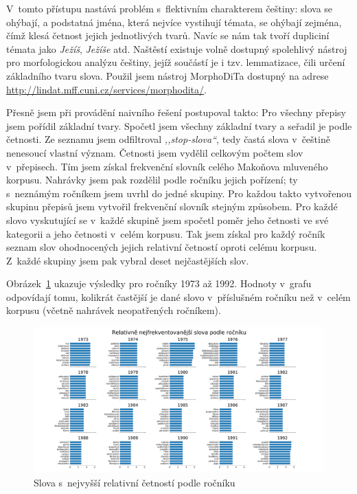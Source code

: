 V~tomto přístupu nastává problém s~flektivním charakterem češtiny: slova se
ohýbají, a podstatná jména, která nejvíce vystihují témata, se ohýbají zejména,
čímž klesá četnost jejich jednotlivých tvarů. Navíc se nám tak tvoří dupliciní
témata jako \textit{Ježíš}, \textit{Ježíše} atd. Naštěstí existuje volně
dostupný spolehlivý nástroj pro morfologickou analýzu češtiny, jejíž součástí je
i tzv. lemmatizace, čili určení základního tvaru slova. Použil jsem nástroj
MorphoDiTa dostupný na adrese
\url{http://lindat.mff.cuni.cz/services/morphodita/}\cite{morphodita}.

Přesně jsem při provádění naivního řešení postupoval takto:
Pro všechny přepisy jsem pořídil základní tvary.
Spočetl jsem všechny základní tvary a seřadil je podle četnosti.
Ze seznamu jsem odfiltroval \textit{,,stop-slova``}, tedy častá slova v~češtině
nenesoucí vlastní význam.
Četnosti jsem vydělil celkovým počtem slov v~přepisech. Tím jsem získal
frekvenční slovník celého Makoňova mluveného korpusu.
Nahrávky jsem pak rozdělil podle ročníku jejich pořízení; ty s~neznámým ročníkem
jsem uvrhl do jedné skupiny.
Pro každou takto vytvořenou skupinu přepisů jsem vytvořil frekvenční slovník
stejným způsobem.
Pro každé slovo vyskutující se v~každé skupině jsem spočetl poměr jeho četnosti
ve své kategorii a jeho četnosti v~celém korpusu.
Tak jsem získal pro každý ročník seznam slov ohodnocených jejich relativní
četností oproti celému korpusu.
Z~každé skupiny jsem pak vybral deset nejčastějších slov.

Obrázek~\ref{fig:topic-by-year-relfreq} ukazuje výsledky pro ročníky 1973 až 1992.
Hodnoty v~grafu odpovídají tomu, kolikrát častější je dané slovo v~příslušném
ročníku než v~celém korpusu (včetně nahrávek neopatřených ročníkem).

\begin{figure}[htpb]
\includegraphics[scale=0.32, angle=90]{rc/topics-by-year-relfreq.pdf}
\caption{Slova s~nejvyšší relativní četností podle ročníku}
\label{fig:topic-by-year-relfreq}
\end{figure}

